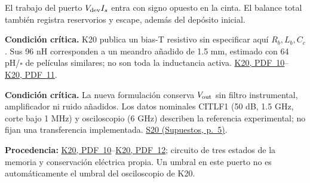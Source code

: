 \documentclass[11pt,a4paper]{article}
\newcommand{\critical}[1]{\par{\small\raggedright\textbf{\color{accent}Condición crítica.} #1\par}}
\newcommand{\origin}[1]{\par{\footnotesize\raggedright\color{ink}\textbf{Procedencia:} #1\par}}
\newcommand{\K}[1]{\href{https://eprints.lancs.ac.uk/id/eprint/140252/3/Binder1.pdf\#page=#1}{K20, PDF~#1}}
\newcommand{\sref}[2]{\href{Supuestos.pdf\#nameddest=#1}{#1 (Supuestos, p.~#2)}}
\newcommand{\smallnote}[1]{{\small #1\par}}
\begin{document}
\smallnote{El trabajo del puerto $V_{\rm dev}I_s$ entra con signo opuesto en la cinta. El balance total también registra reservorios y escape, además del depósito inicial.}
\critical{K20 publica un bias-T resistivo sin especificar aquí $R_b,L_b,C_c$. Sus 96 nH corresponden a un meandro añadido de 1.5 mm, estimado con 64 pH/$\square$ de películas similares; no son toda la inductancia activa. \K{10}--\K{11}.}
\critical{La nueva formulación conserva $V_{\rm out}$ sin filtro instrumental, amplificador ni ruido añadidos. Los datos nominales CITLF1 (50 dB, 1.5 GHz, corte bajo 1 MHz) y osciloscopio (6 GHz) describen la referencia experimental; no fijan una transferencia implementada. \sref{S20}{5}.}
\vfill
\origin{\K{10}--\K{12}; circuito de tres estados de la memoria y conservación eléctrica propia. Un umbral en este puerto no es automáticamente el umbral del osciloscopio de K20.}
\newpage
\end{document}
